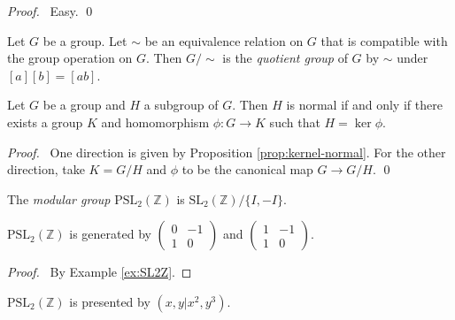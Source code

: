 \begin{proof}
\pf\ Easy. \qed
\end{proof}

\begin{df}
Let $G$ be a group. Let $\sim$ be an equivalence relation on $G$ that is compatible with the group operation on $G$. Then $G/\sim$ is the \emph{quotient group} of $G$ by $\sim$ under $[a][b] = [ab]$.
\end{df}

\begin{prop}
Let $G$ be a group and $H$ a subgroup of $G$. Then $H$ is normal if and only if there exists a group $K$ and homomorphism $\phi : G \rightarrow K$ such that $H = \ker \phi$.
\end{prop}

\begin{proof}
\pf\ One direction is given by Proposition \ref{prop:kernel-normal}. For the other direction, take $K = G / H$ and $\phi$ to be the canonical map $G \rightarrow G / H$. \qed
\end{proof}

\begin{df}
The \emph{modular group} $\mathrm{PSL}_2(\mathbb{Z})$ is $\mathrm{SL}_2(\mathbb{Z}) / \{ I, -I \}$.
\end{df}

\begin{prop}
$\mathrm{PSL}_2(\mathbb{Z})$ is generated by $\left( \begin{array}{cc} 0 & -1 \\ 1 & 0 \end{array} \right)$ and $\left( \begin{array}{cc} 1 & -1 \\ 1 & 0 \end{array} \right)$.
\end{prop}

\begin{proof}
\pf\ By Example \ref{ex:SL2Z}. 
\end{proof}

\begin{prop}
$\mathrm{PSL}_2(\mathbb{Z})$ is presented by $(x,y|x^2,y^3)$.
\end{prop}

